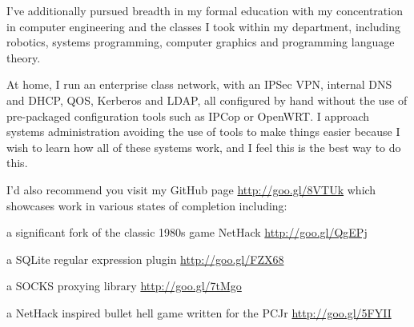 \documentclass[a4paper,margin,line]{resume}
\newcommand{\rurl}[1]{\hfill {\footnotesize \url{#1}}}
\begin{document}
\begin{resume}
	I've additionally pursued breadth in my formal education with my
	concentration in computer engineering and the classes I took within my
	department, including robotics, systems programming, computer graphics and
	programming language theory.

	At home, I run an enterprise class network, with an IPSec VPN, internal DNS and
	DHCP, QOS, Kerberos and LDAP, all configured by hand without the use of
	pre-packaged configuration tools such as IPCop or OpenWRT. I approach
	systems administration avoiding the use of tools to make things easier
	because I wish to learn how all of these systems work, and I feel this is
	the best way to do this.

	I'd also recommend you visit my GitHub page \url{http://goo.gl/8VTUk} which
	showcases work in various states of completion including:
	
	\begin{compactitem}
		\item a significant fork of the classic 1980s game NetHack \rurl{http://goo.gl/QgEPj}
		\item a SQLite regular expression plugin \rurl{http://goo.gl/FZX68}
		\item a SOCKS proxying library \rurl{http://goo.gl/7tMgo}
		\item a NetHack inspired bullet hell game written for the PCJr \rurl{http://goo.gl/5FYII}
	\end{compactitem}
	\normalsize


\end{resume}
\end{document}
